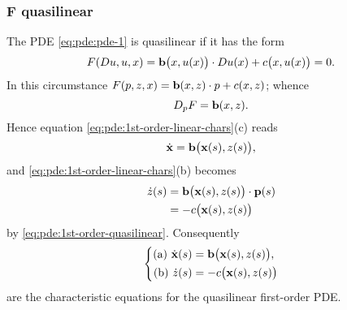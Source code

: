 \subsubsection[\(F\) quasilinear]{\(\bm F\)  quasilinear}
The PDE \eqref{eq:pde:pde-1} is quasilinear if it has the form
\begin{equation}
  \label{eq:pde:1st-order-quasilinear}
  F(Du,u,x)=\mathbf{b}\bigl(x,u(x)\bigr)\cdot Du(x)+c\bigl(x,u(x)\bigr)=0.
\end{equation}
In this circumstance \(F(p,z,x)=\mathbf{b}(x,z)\cdot p+c(x,z)\); whence
\[
  D_pF=\mathbf{b}(x,z).
\]
Hence equation \eqref{eq:pde:1st-order-linear-chars}(c) reads
\[
  \dot{\mathbf{x}}=\mathbf{b}\bigl( \mathbf{x}(s),z(s) \bigr),
\]
and \eqref{eq:pde:1st-order-linear-chars}(b) becomes
\begin{align*}
  \dot z(s)&=\mathbf{b}\bigl(\mathbf{x}(s),z(s)\bigr)\cdot\mathbf{p}(s)\\
           &=-c\bigl(\mathbf{x}(s),z(s)\bigr)
\end{align*}
by \eqref{eq:pde:1st-order-quasilinear}. Consequently
\begin{equation}
  \label{eq:pde:1st-order-quasilinear-chars}
  \left\{
    \begin{aligned}
      \text{(a) } \dot{\mathbf{x}}(s)&=\mathbf{b}\bigl( \mathbf{x}(s),z(s) \bigr),\\
      \text{(b) } \dot z(s)&=-c\bigl( \mathbf{x}(s),z(s) \bigr)
    \end{aligned}
  \right.
\end{equation}
are the characteristic equations for the quasilinear first-order PDE.

